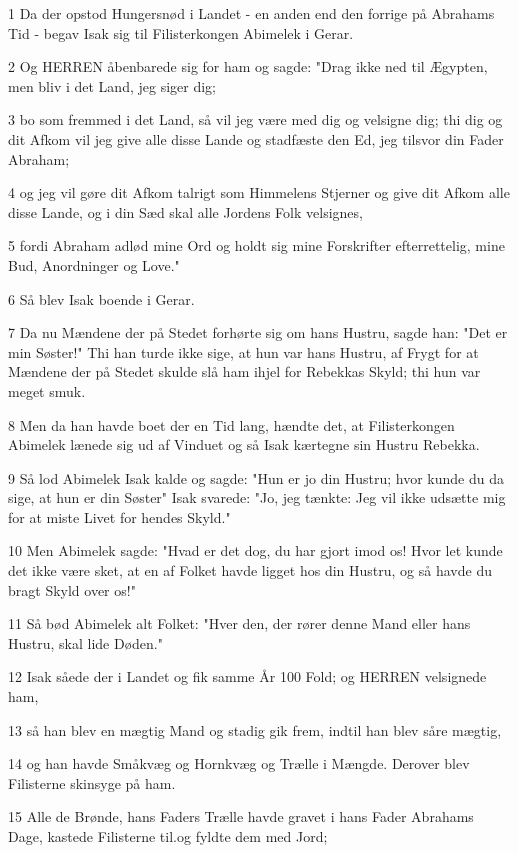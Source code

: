 \par 1 Da der opstod Hungersnød i Landet - en anden end den forrige på Abrahams Tid - begav Isak sig til Filisterkongen Abimelek i Gerar.
\par 2 Og HERREN åbenbarede sig for ham og sagde: "Drag ikke ned til Ægypten, men bliv i det Land, jeg siger dig;
\par 3 bo som fremmed i det Land, så vil jeg være med dig og velsigne dig; thi dig og dit Afkom vil jeg give alle disse Lande og stadfæste den Ed, jeg tilsvor din Fader Abraham;
\par 4 og jeg vil gøre dit Afkom talrigt som Himmelens Stjerner og give dit Afkom alle disse Lande, og i din Sæd skal alle Jordens Folk velsignes,
\par 5 fordi Abraham adlød mine Ord og holdt sig mine Forskrifter efterrettelig, mine Bud, Anordninger og Love."
\par 6 Så blev Isak boende i Gerar.
\par 7 Da nu Mændene der på Stedet forhørte sig om hans Hustru, sagde han: "Det er min Søster!" Thi han turde ikke sige, at hun var hans Hustru, af Frygt for at Mændene der på Stedet skulde slå ham ihjel for Rebekkas Skyld; thi hun var meget smuk.
\par 8 Men da han havde boet der en Tid lang, hændte det, at Filisterkongen Abimelek lænede sig ud af Vinduet og så Isak kærtegne sin Hustru Rebekka.
\par 9 Så lod Abimelek Isak kalde og sagde: "Hun er jo din Hustru; hvor kunde du da sige, at hun er din Søster" Isak svarede: "Jo, jeg tænkte: Jeg vil ikke udsætte mig for at miste Livet for hendes Skyld."
\par 10 Men Abimelek sagde: "Hvad er det dog, du har gjort imod os! Hvor let kunde det ikke være sket, at en af Folket havde ligget hos din Hustru, og så havde du bragt Skyld over os!"
\par 11 Så bød Abimelek alt Folket: "Hver den, der rører denne Mand eller hans Hustru, skal lide Døden."
\par 12 Isak såede der i Landet og fik samme År 100 Fold; og HERREN velsignede ham,
\par 13 så han blev en mægtig Mand og stadig gik frem, indtil han blev såre mægtig,
\par 14 og han havde Småkvæg og Hornkvæg og Trælle i Mængde. Derover blev Filisterne skinsyge på ham.
\par 15 Alle de Brønde, hans Faders Trælle havde gravet i hans Fader Abrahams Dage, kastede Filisterne til.og fyldte dem med Jord;
